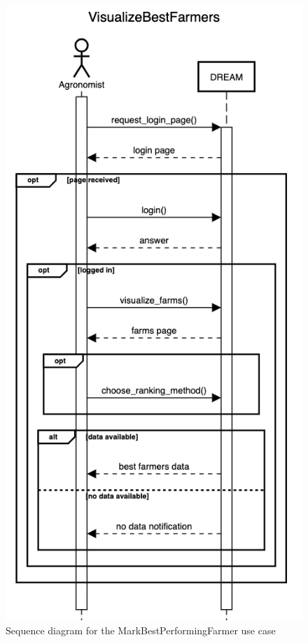 \documentclass{article}
\begin{document}
\begin{figure}[H]
    \centering
	\includegraphics[scale=0.5]{sequence_diagrams/VisualizeBestFarmers}
    \caption{Sequence diagram for the MarkBestPerformingFarmer use case}
\end{figure}
\end{document}
